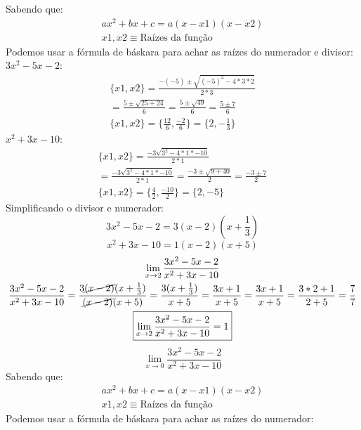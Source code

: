 \documentclass{jhwhw}
\begin{document}
\newpage
{}
Sabendo que:
\begin{gather*}
    ax^2 + bx + c = a(x-x1)(x-x2)\\
    x1, x2 \equiv \text{Raízes da função}   
\end{gather*}
Podemos usar a fórmula de báskara para achar as raízes do numerador e divisor:\\
\boldmath$3x^2 -5x -2$\unboldmath:
\begin{multline*}
    \{x1, x2\} = \frac{-(-5) \pm \sqrt{(-5)^2 - 4 * 3 * 2}}{2*3} \\
    = \frac{5 \pm \sqrt{25 + 24}}{6} = \frac{5 \pm \sqrt{49}}{6} = \frac{5 \pm 7}{6} \\
    \boxed{\{x1, x2\} = \biggl\{\frac{12}{6}, \frac{-2}{6}\biggr\} = \biggl\{2, -\frac{1}{3}\biggr\}}
\end{multline*}
\boldmath$x^2 + 3x - 10$\unboldmath:
\begin{multline*}
    \{x1, x2\} = \frac{-3 \sqrt{3^2 - 4 * 1 * -10}}{2*1} \\= \frac{-3 \sqrt{3^2 - 4 * 1 * -10}}{2*1} = \frac{-3 \pm \sqrt{9 + 40}}{2} = \frac{-3 \pm 7}{2} \\
    \boxed{\{x1, x2\} = \biggl\{\frac{4}{2}, \frac{-10}{2}\biggr\} = \biggl\{2, -5\biggr\}}
\end{multline*}
Simplificando o divisor e numerador:
\begin{equation*}
    3x^2 - 5x - 2 = 3(x-2)(x+\frac{1}{3})
\end{equation*}
\begin{equation*}
    x^2 + 3x - 10 = 1(x-2)(x+5)
\end{equation*}
\begin{multline*}
    \lim_{x \to 2} \frac{3x^2 - 5x - 2}{x^2 + 3x - 10} \\ \frac{3x^2 - 5x - 2}{x^2 + 3x - 10} = \frac{3\cancel{(x-2)}(x+\frac{1}{3})}{\cancel{(x-2)}(x+5)} = \frac{3(x+\frac{1}{3})}{x+5} = \frac{3x+1}{x+5} = \frac{3x+1}{x+5} = \frac{3*2+1}{2+5} = \frac{7}{7} \\
    \boxed{\lim_{x \to 2} \frac{3x^2 - 5x - 2}{x^2 + 3x - 10} = 1}
\end{multline*}
\newpage
{}
$$\lim_{x \to 0} \frac{3x^2 - 5x - 2}{x^2 + 3x - 10}$$
Sabendo que:
\begin{gather*}
    ax^2 + bx + c = a(x-x1)(x-x2)\\
    x1, x2 \equiv \text{Raízes da função}   
\end{gather*}
Podemos usar a fórmula de báskara para achar as raízes do numerador:
\end{document}
